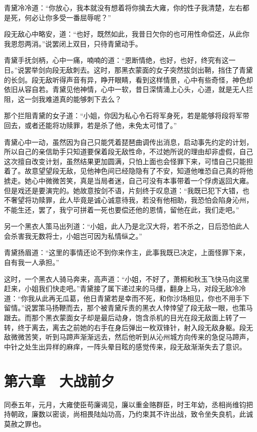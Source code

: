 青黛冷冷道：“你放心，我本就没有想着将你擒去大雍，你的性子我清楚，左右都是死，何必让你多受一番屈辱呢？”

段无敌心中略安，道：“也好，既然如此，我昔日欠你的也可用性命偿还，从此你我恩怨两消。”说罢闭上双目，只待青黛动手。

青黛手抚剑柄，心中一痛，喃喃的道：“恩断情绝，也好，也好，终究有这一日。”说罢举剑向段无敌刺去。这时，那黑衣蒙面的女子突然拔剑出鞘，挡住了青黛的长剑。段无敌听得声音有异，睁开眼睛，看到这样情景，心中有些奇怪，神色却依旧从容自若。青黛见他神情，心中一软，昔日深情涌上心头，心道，就是无人拦阻，这一剑我难道真的能够刺下去么？

那个拦阻青黛的女子道：“小姐，你因为私心令石将军身死，若是能够将段将军带回去，或者还能将功赎罪，若是杀了他，未免太可惜了。”

青黛心中一动，虽然因为自己只能凭着琵琶曲调传出消息，启动事先约定的计划，所以自己的亲信助手只知道要保着段无敌性命，不过她所说的理由却非虚假，自己这次擅自改变计划，虽然结果更加圆满，只怕上面也会怪罪下来，可惜自己只能担着了。故意望望段无敌，见他神色间已经隐隐有了不安，知道他唯恐自己真的将他掳走。她心中微微苦笑，真是当局者迷，自己可没有本事带着一个俘虏返回大雍。但是戏还是要演完的。她故意按剑不语，片刻终于叹息道：“我既已犯下大错，也不奢望将功赎罪，此人毕竟是诚心诚意待我，若没有他相助，我恐怕会陷身沁州，不能生还，罢了，我宁可拼着一死也要偿还他的恩情，留他在此，我们走吧。”

另一个黑衣人策马出列道：“小姐，此人乃是北汉大将，若不杀之，日后恐怕此人会杀害我无数将士，小姐岂可因为私情纵之。”

青黛扬眉道：“这里的事情还论不到你来作主，此事我既已决定，上面怪罪下来，自有我一人承担。”

这时，一个黑衣人骑马奔来，高声道：“小姐，不好了，萧桐和秋玉飞快马向这里赶来，小姐我们快走吧。”青黛接了属下递过来的马缰，翻身上马，对段无敌冷冷道：“你我从此再无瓜葛，他日青黛若是幸而不死，和你沙场相见，你也不用手下留情。”说罢策马扬鞭而去，那个被青黛斥责的黑衣人悻悻望了段无敌一眼，也策马跟去。而那个黑衣蒙面女子却是最后动身，饱含杀机的目光在段无敌面上转了一转，终于离去，离去之前她的右手在身后弹出一枚双锋针，射入段无敌身躯。段无敌微微苦笑，听到马蹄声渐渐远去，然后他听到从沁州城方向传来的急促马蹄声，中针之处生出异样的麻痒，一阵头晕目眩的感觉传来，段无敌渐渐失去了意识。

\chapter{第六章　大战前夕}

同泰五年，元月，大雍使臣苟廉谒见，廉以重金赂群臣，时王年幼，丞相尚维钧把持朝政，廉数以密谈，尚相畏陆灿功高，乃约束其不许出战，致令坐失良机，此诚莫赦之罪也。

